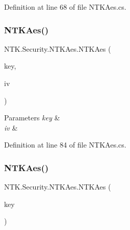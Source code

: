 Definition at line 68 of file N\+T\+K\+Aes.\+cs.

\mbox{\label{class_n_t_k_1_1_security_1_1_n_t_k_aes_a9dca3e66e70f494151ffe863b0e2fd31}} 
\subsubsection{\texorpdfstring{NTKAes()}{NTKAes()}\hspace{0.1cm}{\footnotesize\ttfamily [2/3]}}
{\footnotesize\ttfamily N\+T\+K.\+Security.\+N\+T\+K\+Aes.\+N\+T\+K\+Aes (\begin{DoxyParamCaption}\item[{byte \mbox{[}$\,$\mbox{]}}]{key,  }\item[{byte \mbox{[}$\,$\mbox{]}}]{iv }\end{DoxyParamCaption})}






\begin{DoxyParams}{Parameters}
{\em key} & \\
\hline
{\em iv} & \\
\hline
\end{DoxyParams}


Definition at line 84 of file N\+T\+K\+Aes.\+cs.

\mbox{\label{class_n_t_k_1_1_security_1_1_n_t_k_aes_a961f23c2649d2f56dedb0db5d9e394db}} 
\subsubsection{\texorpdfstring{NTKAes()}{NTKAes()}\hspace{0.1cm}{\footnotesize\ttfamily [3/3]}}
{\footnotesize\ttfamily N\+T\+K.\+Security.\+N\+T\+K\+Aes.\+N\+T\+K\+Aes (\begin{DoxyParamCaption}\item[{\mbox{\hyperlink{struct_n_t_k_1_1_security_1_1_aes_key}{Aes\+Key}}}]{key }\end{DoxyParamCaption})}






